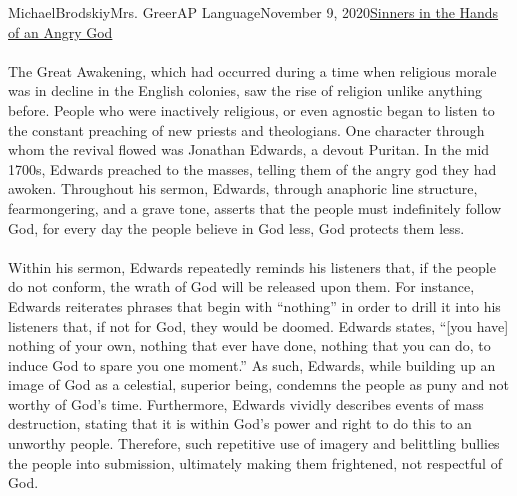 \documentclass[12pt,letterpaper]{article}
\begin{document}
\begin{mla}{Michael}{Brodskiy}{Mrs. Greer}{AP Language}{November 9, 2020}{\underline{Sinners in the Hands of an Angry God}}


  \begin{justifying}

    \paragraph{} The Great Awakening, which had occurred during a time when religious morale was in decline in the English colonies, saw the rise of religion unlike anything before. People who were inactively religious, or even agnostic began to listen to the constant preaching of new priests and theologians. One character through whom the revival flowed was Jonathan Edwards, a devout Puritan. In the mid 1700s, Edwards preached to the masses, telling them of the angry god they had awoken. Throughout his sermon, Edwards, through anaphoric line structure, fearmongering, and a grave tone, asserts that the people must indefinitely follow God, for every day the people believe in God less, God protects them less.

    \paragraph{} Within his sermon, Edwards repeatedly reminds his listeners that, if the people do not conform, the wrath of God will be released upon them. For instance, Edwards reiterates phrases that begin with ``nothing'' in order to drill it into his listeners that, if not for God, they would be doomed. Edwards states, ``[you have] nothing of your own, nothing that ever have done, nothing that you can do, to induce God to spare you one moment.'' As such, Edwards, while building up an image of God as a celestial, superior being, condemns the people as puny and not worthy of God's time. Furthermore, Edwards vividly describes events of mass destruction, stating that it is within God's power and right to do this to an unworthy people. Therefore, such repetitive use of imagery and belittling bullies the people into submission, ultimately making them frightened, not respectful of God.


\end{justifying}
\end{mla}
\end{document}
